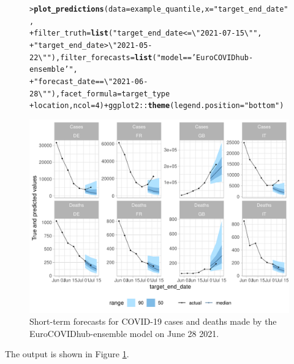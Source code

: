 \documentclass[article,shortnames]{jss}\usepackage[]{graphicx}\usepackage[]{color}
\makeatletter
\def\maxwidth{ %
  \ifdim\Gin@nat@width>\linewidth
    \linewidth
  \else
    \Gin@nat@width
  \fi
}
\newcommand{\hlnum}[1]{\textcolor[rgb]{0.686,0.059,0.569}{#1}}%
\newcommand{\hlstr}[1]{\textcolor[rgb]{0.192,0.494,0.8}{#1}}%
\newcommand{\hlopt}[1]{\textcolor[rgb]{0,0,0}{#1}}%
\newcommand{\hlstd}[1]{\textcolor[rgb]{0.345,0.345,0.345}{#1}}%
\newcommand{\hlkwc}[1]{\textcolor[rgb]{0.333,0.667,0.333}{#1}}%
\newcommand{\hlkwd}[1]{\textcolor[rgb]{0.737,0.353,0.396}{\textbf{#1}}}%
\newenvironment{kframe}{%
 \def\at@end@of@kframe{}%
 \ifinner\ifhmode%
  \def\at@end@of@kframe{\end{minipage}}%
  \begin{minipage}{\columnwidth}%
 \fi\fi%
 \def\FrameCommand##1{\hskip\@totalleftmargin \hskip-\fboxsep
 \colorbox{shadecolor}{##1}\hskip-\fboxsep
     \hskip-\linewidth \hskip-\@totalleftmargin \hskip\columnwidth}%
 \MakeFramed {\advance\hsize-\width
   \@totalleftmargin\z@ \linewidth\hsize
   \@setminipage}}%
 {\par\unskip\endMakeFramed%
 \at@end@of@kframe}
\newenvironment{knitrout}{}{} %
\makeatother
\begin{document}
\begin{figure}[h!]
\centering
\begin{knitrout}
\color{fgcolor}\begin{kframe}
\begin{alltt}
\hlstd{> }\hlkwd{plot_predictions}\hlstd{(}\hlkwc{data} \hlstd{= example_quantile,} \hlkwc{x} \hlstd{=} \hlstr{"target_end_date"}\hlstd{,}
\hlstd{+ }    \hlkwc{filter_truth} \hlstd{=} \hlkwd{list}\hlstd{(}\hlstr{"target_end_date <= \textbackslash{}"2021-07-15\textbackslash{}""}\hlstd{,}
\hlstd{+ }        \hlstr{"target_end_date > \textbackslash{}"2021-05-22\textbackslash{}""}\hlstd{),} \hlkwc{filter_forecasts} \hlstd{=} \hlkwd{list}\hlstd{(}\hlstr{"model == 'EuroCOVIDhub-ensemble'"}\hlstd{,}
\hlstd{+ }        \hlstr{"forecast_date == \textbackslash{}"2021-06-28\textbackslash{}""}\hlstd{),} \hlkwc{facet_formula} \hlstd{= target_type} \hlopt{~}
\hlstd{+ }        \hlstd{location,} \hlkwc{ncol} \hlstd{=} \hlnum{4}\hlstd{)} \hlopt{+} \hlstd{ggplot2}\hlopt{::}\hlkwd{theme}\hlstd{(}\hlkwc{legend.position} \hlstd{=} \hlstr{"bottom"}\hlstd{)}
\end{alltt}
\end{kframe}
\includegraphics[width=\maxwidth]{plots/plot-show-forecasts-1} 
\end{knitrout}
\caption{\label{fig:forecast-visualisation} Short-term forecasts for COVID-19 cases and deaths made by the EuroCOVIDhub-ensemble model on June 28 2021.}
\end{figure}
% 
The output is shown in Figure \ref{fig:forecast-visualisation}.
\end{document}
